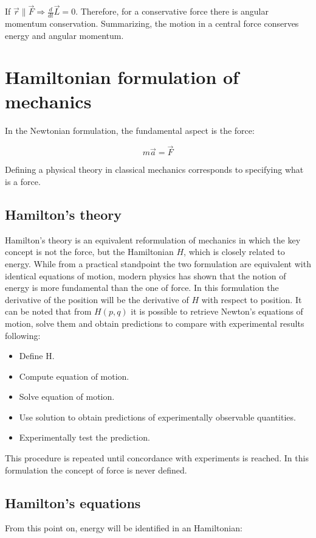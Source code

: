   If $\vec{r}\parallel \vec{F}\Rightarrow \frac{d{}}{d{t}}\vec{L} = 0$.
  Therefore, for a conservative force there is angular momentum conservation.
  Summarizing, the motion in a central force conserves energy and angular momentum.

\section{Hamiltonian formulation of mechanics}
In the Newtonian formulation, the fundamental aspect is the force:

$$m \vec{a} = \vec{F}$$

Defining a physical theory in classical mechanics corresponds to specifying what is a force.

  \subsection{Hamilton's theory}
  Hamilton's theory is an equivalent reformulation of mechanics in which the key concept is not the force, but the Hamiltonian $H$, which is closely related to energy.
  While from a practical standpoint the two formulation are equivalent with identical equations of motion, modern physics has shown that the notion of energy is more fundamental than the one of force.
  In this formulation the derivative of the position will be the derivative of $H$ with respect to position.
  It can be noted that from $H(p,q)$ it is possible to retrieve Newton's equations of motion, solve them and obtain predictions to compare with experimental results following:

  \begin{multicols}{2}
    \begin{itemize}
        \item Define H.
        \item Compute equation of motion.
        \item Solve equation of motion.
        \item Use solution to obtain predictions of experimentally observable quantities.
        \item Experimentally test the prediction.
    \end{itemize}
  \end{multicols}

  This procedure is repeated until concordance with experiments is reached.
  In this formulation the concept of force is never defined.

  \subsection{Hamilton's equations}
  From this point on, energy will be identified in an Hamiltonian:

